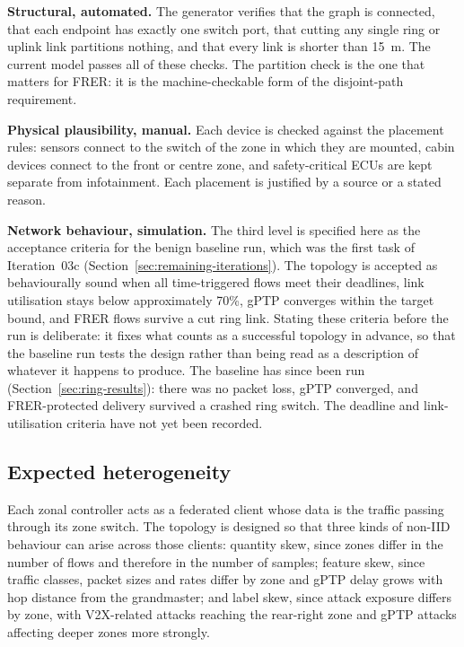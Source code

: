 \textbf{Structural, automated.} The generator verifies that the graph is connected,
that each endpoint has exactly one switch port, that cutting any single ring or uplink
link partitions nothing, and that every link is shorter than 15~m. The current model
passes all of these checks. The partition check is the one that matters for FRER: it is
the machine-checkable form of the disjoint-path requirement.

\textbf{Physical plausibility, manual.} Each device is checked against the placement
rules: sensors connect to the switch of the zone in which they are mounted, cabin
devices connect to the front or centre zone, and safety-critical ECUs are kept separate
from infotainment. Each placement is justified by a source or a stated reason.

\textbf{Network behaviour, simulation.} The third level is specified here as the
acceptance criteria for the benign baseline run, which was the first task of Iteration~03c (Section~\ref{sec:remaining-iterations}). The topology is accepted as behaviourally sound when all
time-triggered flows meet their deadlines, link utilisation stays below approximately
70\%, gPTP converges within the target bound, and FRER flows survive a cut ring link.
Stating these criteria before the run is deliberate: it fixes what counts as a
successful topology in advance, so that the baseline run tests the design rather than
being read as a description of whatever it happens to produce. The baseline has since
been run (Section~\ref{sec:ring-results}): there was no packet loss, gPTP converged, and
FRER-protected delivery survived a crashed ring switch. The deadline and link-utilisation
criteria have not yet been recorded.

\subsection{Expected heterogeneity}
Each zonal controller acts as a federated client whose data is the traffic passing
through its zone switch. The topology is designed so that three kinds of non-IID
behaviour can arise across those clients: quantity skew, since zones differ in the
number of flows and therefore in the number of samples; feature skew, since traffic
classes, packet sizes and rates differ by zone and gPTP delay grows with hop distance
from the grandmaster; and label skew, since attack exposure differs by zone, with
V2X-related attacks reaching the rear-right zone and gPTP attacks affecting deeper
zones more strongly.


